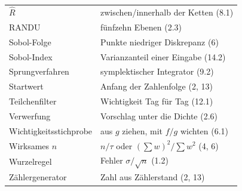 \begin{merksatz}
\begin{center}
{\begin{longtable}{@{}P{3.6cm}P{5.0cm}@{}}
$\hat R$ & zwischen/innerhalb der Ketten (8.1)\\
RANDU & fünfzehn Ebenen (2.3)\\
Sobol-Folge & Punkte niedriger Diskrepanz (6)\\
Sobol-Index & Varianzanteil einer Eingabe (14.2)\\
Sprungverfahren & symplektischer Integrator (9.2)\\
Startwert & Anfang der Zahlenfolge (2, 13)\\
Teilchenfilter & Wichtigkeit Tag für Tag (12.1)\\
Verwerfung & Vorschlag unter die Dichte (2.6)\\
Wichtigkeitsstichprobe & aus $g$ ziehen, mit $f/g$ wichten (6.1)\\
Wirksames $n$ & $n/\tau$ oder $(\sum w)^2/\sum w^2$ (4, 6)\\
Wurzelregel & Fehler $\sigma/\sqrt n$ (1.2)\\
Zählergenerator & Zahl aus Zählerstand (2, 13)\\
\bottomrule
\end{longtable}}
\end{center}
\end{merksatz}
